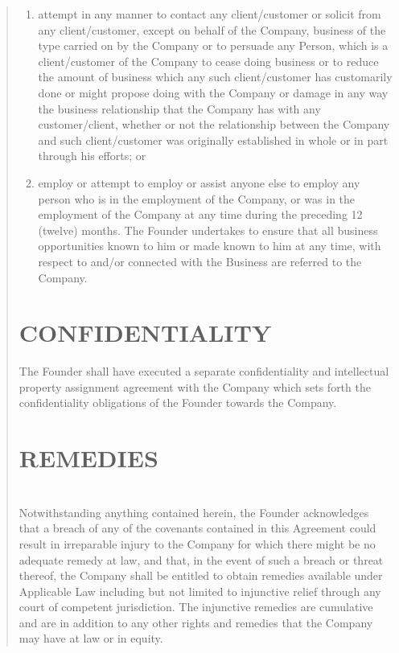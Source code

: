 \documentclass[
]{article}
\begin{document}
\begin{quote}
\begin{enumerate}[label=\alph*).]  %
  \item attempt in any manner to contact any client/customer or solicit from
        any client/customer, except on behalf of the Company, business of the
        type carried on by the Company or to persuade any Person, which is a
        client/customer of the Company to cease doing business or to reduce the
        amount of business which any such client/customer has customarily done
        or might propose doing with the Company or damage in any way the
        business relationship that the Company has with any customer/client,
        whether or not the relationship between the Company and such
        client/customer was originally established in whole or in part through
        his efforts; or
  \item employ or attempt to employ or assist anyone else to employ any person
        who is in the employment of the Company, or was in the employment of
        the Company at any time during the preceding 12 (twelve) months. The
        Founder undertakes to ensure that all business opportunities known to
        him or made known to him at any time, with respect to and/or connected
        with the Business are referred to the Company.
\end{enumerate}

\section{CONFIDENTIALITY}

The Founder shall have executed a separate confidentiality and
intellectual property assignment agreement with the Company which sets
forth the confidentiality obligations of the Founder towards the
Company.

\section{REMEDIES}\\
Notwithstanding anything contained herein, the Founder acknowledges that
a breach of any of the covenants contained in this Agreement could
result in irreparable injury to the Company for which there might be no
adequate
remedy at law, and that, in the event of such a breach or threat
thereof, the Company shall be entitled to obtain remedies available
under Applicable Law including but not limited to injunctive relief
through any court of competent jurisdiction. The injunctive remedies are
cumulative and are in addition to any other rights and remedies that the
Company may have at law or in equity.


\end{quote}
\end{document}
